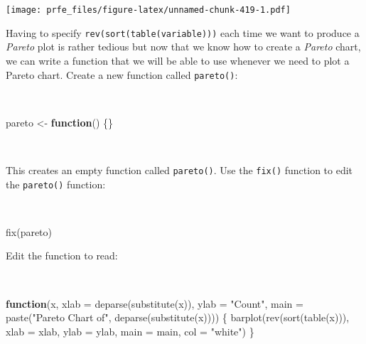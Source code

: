 \documentclass[
  12pt,
  a4paper]{book}
\newenvironment{Shaded}{\begin{snugshade}}{\end{snugshade}}
\newcommand{\AttributeTok}[1]{\textcolor[rgb]{0.77,0.63,0.00}{#1}}
\newcommand{\ControlFlowTok}[1]{\textcolor[rgb]{0.13,0.29,0.53}{\textbf{#1}}}
\newcommand{\FunctionTok}[1]{\textcolor[rgb]{0.00,0.00,0.00}{#1}}
\newcommand{\NormalTok}[1]{#1}
\newcommand{\OtherTok}[1]{\textcolor[rgb]{0.56,0.35,0.01}{#1}}
\newcommand{\StringTok}[1]{\textcolor[rgb]{0.31,0.60,0.02}{#1}}
\begin{document}
\texttt{[image: prfe\_files/figure-latex/unnamed-chunk-419-1.pdf]}

\newpage

Having to specify \texttt{rev(sort(table(variable)))} each time we want to produce a \emph{Pareto} plot is rather tedious but now that we know how to create a \emph{Pareto} chart, we can write a function that we will be able to use whenever we need to plot a Pareto chart. Create a new function called \texttt{pareto()}:

~

\begin{Shaded}
\begin{Highlighting}[]
\NormalTok{pareto }\OtherTok{\textless{}{-}} \ControlFlowTok{function}\NormalTok{() \{\}}
\end{Highlighting}
\end{Shaded}

~

This creates an empty function called \texttt{pareto()}. Use the \texttt{fix()} function to edit the \texttt{pareto()} function:

~

\begin{Shaded}
\begin{Highlighting}[]
\FunctionTok{fix}\NormalTok{(pareto)}
\end{Highlighting}
\end{Shaded}

Edit the function to read:

~

\begin{Shaded}
\begin{Highlighting}[]
\ControlFlowTok{function}\NormalTok{(x,}
         \AttributeTok{xlab =} \FunctionTok{deparse}\NormalTok{(}\FunctionTok{substitute}\NormalTok{(x)),}
         \AttributeTok{ylab =} \StringTok{"Count"}\NormalTok{,}
         \AttributeTok{main =} \FunctionTok{paste}\NormalTok{(}\StringTok{"Pareto Chart of"}\NormalTok{, }\FunctionTok{deparse}\NormalTok{(}\FunctionTok{substitute}\NormalTok{(x)))) \{}
  \FunctionTok{barplot}\NormalTok{(}\FunctionTok{rev}\NormalTok{(}\FunctionTok{sort}\NormalTok{(}\FunctionTok{table}\NormalTok{(x))),}
          \AttributeTok{xlab =}\NormalTok{ xlab,}
          \AttributeTok{ylab =}\NormalTok{ ylab,}
          \AttributeTok{main =}\NormalTok{ main,}
          \AttributeTok{col =} \StringTok{"white"}\NormalTok{)}
\NormalTok{\}}
\end{Highlighting}
\end{Shaded}
\end{document}
